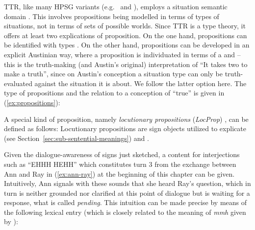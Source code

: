 \documentclass[output=paper
 	        ,biblatex
                ,babelshorthands
                ,newtxmath
                ,draftmode
                ,colorlinks, citecolor=brown
]{langscibook}
\begin{document}
TTR, like many HPSG variants (e.g.\ \citealt{Pollard:Sag:1987} and \citealt{Pollard:Sag:1994}), employs a situation semantic domain \citep{Cooper:ms}.
%
This involves propositions being modelled in terms of types of situations, not in terms of sets of possible worlds.
%
Since TTR is a type theory, it offers at least two explications of proposition.
%
On the one hand, propositions can be identified with types \citep{Cooper:2005:b}.
%
On the other hand, propositions can be developed in an explicit Austinian  \citep{Austin:1950} way, where a proposition is individuated in terms of a  and  \citep[]{Ginzburg:2011:a} -- this is the truth-making (and Austin's original) interpretation of \enquote{It takes two to make a truth}, since on Austin's conception a situation type can only be truth-evaluated against the situation it is about.
%
We follow the latter option here.
%
The type of propositions and the relation to a  conception of \enquote{true} \citep{Barwise:Perry:1983} is given in (\ref{ex:propositions}):
%
\ea \label{ex:propositions}
\ea 
{}
\ex 
{}
\z
\z

A special kind of proposition, namely \emph{locutionary propositions} (\emph{LocProp}) \citep[]{Ginzburg:2012}, can be defined as follows:
%
\ea \label{ex:locprop}
\z
%
Locutionary propositions are sign objects utilized to explicate  (see Section~\ref{sec:sub-sentential-meanings}) and . 
  

Given the dialogue-awareness of signs just sketched, a content for interjections such as \enquote{EHHH HEHH} which constitutes turn 3 from the exchange between Ann and Ray in (\ref{ex:ann-ray}) at the beginning of this chapter can be given.
%
Intuitively, Ann signals with these sounds that she heard Ray's question, which in turn is neither grounded nor clarified at this point of dialogue but is waiting for a response, what is called \emph{pending}. 
%
This intuition can be made precise by means of the following lexical entry (which is closely related to the meaning of \textit{mmh} given by \citealt[]{Ginzburg:2012}):
%
\ea \label{ex:ehh-hehh}
\avm{
[phon & : < ehh hehh > \\
cat & :	[head=\type{interjection} & : syncat ] \\
dgb-params & :	[spkr & : Ind \\
              	addr & : Ind \\
              	pending & : LocProp \\
              	c2 & : address!(spkr,addr,pending)! ] \\
\punk{cont=\type{Understand}(spkr,addr,dgb-params.pending)}{: IllocProp} ]
}
\z
\end{document}
